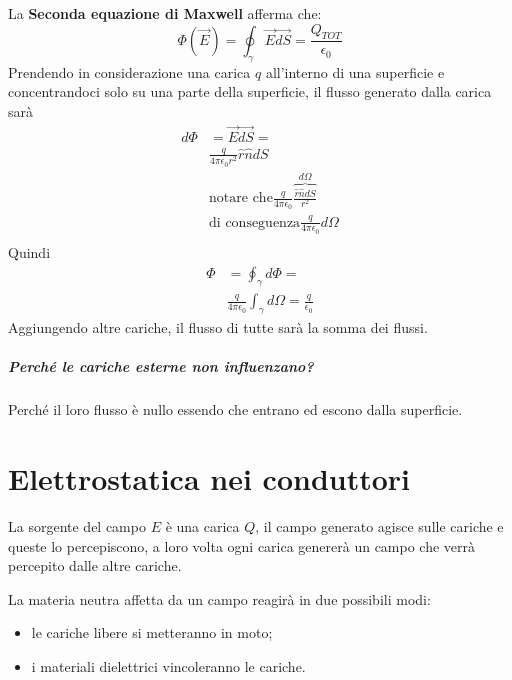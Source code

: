 \documentclass[a4paper, 12pt]{book}
\theoremstyle{plain}
\begin{document}
La \textbf{Seconda equazione di Maxwell} afferma che: \[\Phi(\vec{E}) = \oint_{\gamma}\vec{E}\vec{dS} = \frac{Q_{TOT}}{\epsilon_0}\]
Prendendo in considerazione una carica $q$ all'interno di una superficie e concentrandoci solo su una parte della superficie, il flusso generato dalla carica sarà 
\[
\begin{split}
	d\Phi &= \vec{E}\vec{dS}= \\
	&\frac{q}{4\pi\epsilon_0r^2}\hat{r}\hat{n}dS \\
	&\text{notare che}
	\frac{q}{4\pi \epsilon_0}\overbrace{\frac{\hat{r}\hat{n}dS}{r^2}}^{d\Omega} \\
	&\text{di conseguenza} 
	\frac{q}{4\pi \epsilon_0}d\Omega \\
\end{split}
\]
Quindi
\[
\begin{split}
\Phi &= \oint_{\gamma} d\Phi = \\
&\frac{q}{4\pi \epsilon_0}\int_{\gamma}d\Omega = \frac{q}{\epsilon_0}
\end{split}
\]
Aggiungendo altre cariche, il flusso di tutte sarà la somma dei flussi.
\paragraph{Perché le cariche esterne non influenzano?}
Perché il loro flusso è nullo essendo che entrano ed escono dalla superficie.

\chapter{Elettrostatica nei conduttori}
La sorgente del campo $E$ è una carica ${Q}$, il campo generato 
agisce sulle cariche e queste lo percepiscono, a loro volta ogni 
carica genererà un campo che verrà percepito dalle altre cariche.

La materia neutra affetta da un campo reagirà in due possibili modi:
\begin{itemize}
    \item le cariche libere si metteranno in moto;
    \item i materiali dielettrici vincoleranno le cariche.
\end{itemize}
\end{document}
